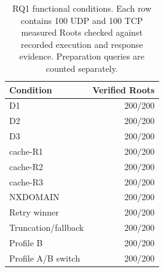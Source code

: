 \begin{table}[t]
\centering\small
\setlength{\tabcolsep}{3.5pt}
\caption{RQ1 functional conditions. Each row contains 100 UDP and 100 TCP measured Roots checked against recorded execution and response evidence. Preparation queries are counted separately.}
\label{tab:rq1}
\begin{tabularx}{\columnwidth}{@{}Xr@{}}
\toprule
Condition & Verified Roots \\
\midrule
D1 & 200/200 \\
D2 & 200/200 \\
D3 & 200/200 \\
cache-R1 & 200/200 \\
cache-R2 & 200/200 \\
cache-R3 & 200/200 \\
NXDOMAIN & 200/200 \\
Retry winner & 200/200 \\
Truncation/fallback & 200/200 \\
Profile B & 200/200 \\
Profile A/B switch & 200/200 \\
\bottomrule
\end{tabularx}
\end{table}

